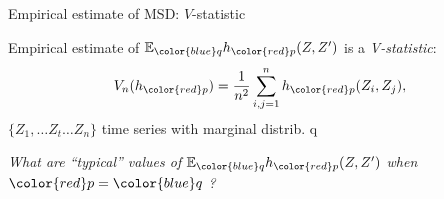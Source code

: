 \documentclass{beamer}
\begin{document}

 
 \begin{frame}{Empirical estimate of MSD: $V$-statistic}

Empirical estimate  of $\ev_{\color{blue} q} h_{\color{red} p}(Z,Z')$ is
a {\em V-statistic}: 
\[
 V_n(h_{\color{red} p}) = \frac {1} {n^2} \sum_{i,j=1}^n h_{\color{red} p}(Z_i,Z_j),
\]
 $\{ Z_1 ,\ldots Z_t \ldots Z_n \}$ time series with marginal distrib.  {\color{blue} q}
   
\pause




\begin{center}
 {\large\emph{  What are ``typical'' values of  $\ev_{\color{blue} q} h_{\color{red} p}(Z,Z')$ when ${\color{red} p} = {\color{blue} q}$ ? }}
 \end{center}


 \end{frame}
 
\end{document}
